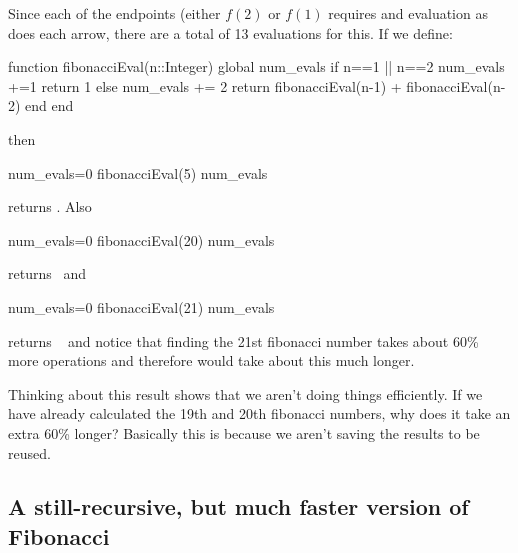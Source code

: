 Since each of the endpoints (either $f(2)$ or $f(1)$ requires and evaluation as does each arrow, there are a total of 13 evaluations for this.  If we define:
%
\begin{jlblock}[fibonacci]
function fibonacciEval(n::Integer)
  global num_evals
  if n==1 || n==2 
    num_evals +=1 
    return 1
  else
    num_evals += 2
    return fibonacciEval(n-1) + fibonacciEval(n-2)
  end
end
\end{jlblock}
then 
\begin{jlblock}[fibonacci]
num_evals=0
fibonacciEval(5)
num_evals
\end{jlblock}
returns  \printpythontex[verb]. Also
\begin{jlblock}[fibonacci]
num_evals=0
fibonacciEval(20)
num_evals
\end{jlblock}
returns  \printpythontex[verb]~and
\begin{jlblock}[fibonacci]
num_evals=0
fibonacciEval(21)
num_evals
\end{jlblock}
returns  \printpythontex[verb]~ and notice that finding the 21st fibonacci number takes about 60\% more operations and therefore would take about this much longer.  

Thinking about this result shows that we aren't doing things efficiently.  If we have already calculated the 19th and 20th fibonacci numbers, why does it take an extra 60\% longer?  Basically this is because we aren't saving the results to be reused. 

\subsection{A still-recursive, but much faster version of Fibonacci} 

